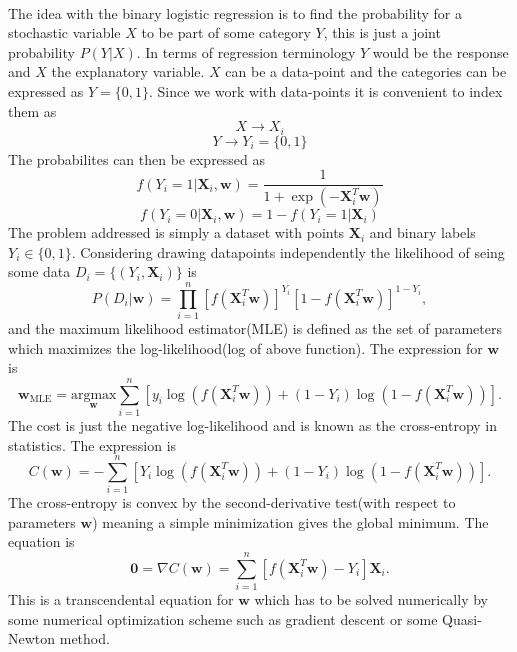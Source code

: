 \documentclass[10pt, t]{beamer}
\begin{document}
    \begin{center}
    \end{center}
    { \hspace*{\fill} \\}
    
    The idea with the binary logistic regression is to find the probability
for a stochastic variable \(X\) to be part of some category \(Y\), this
is just a joint probability \(P(Y|X)\). In terms of regression
terminology \(Y\) would be the response and \(X\) the explanatory
variable. \(X\) can be a data-point and the categories can be expressed
as \(Y=\{0,1\}\). Since we work with data-points it is convenient to
index them as \[X\rightarrow X_i\] \[Y\rightarrow Y_i=\{0,1\}\] The
probabilites can then be expressed as
\[f(Y_i=1|\boldsymbol{X}_i,\boldsymbol{w}) = \frac{1}{1 + \exp(-\boldsymbol{X}_i^T\boldsymbol{w})}\]
\[f(Y_i=0|\boldsymbol{X}_i,\boldsymbol{w}) = 1 - f(Y_i=1|\boldsymbol{X}_i)\]
The problem addressed is simply a dataset with points
\(\boldsymbol{X}_i\) and binary labels \(Y_i\in\{0,1\}\). Considering
drawing datapoints independently the likelihood of seing some data
\(D_i=\{(Y_i,\boldsymbol{X}_i)\}\) is
\[P(D_i|\boldsymbol{w}) = \prod_{i=1}^n\left[f\left(\boldsymbol{X}_i^T\boldsymbol{w}\right)\right]^{Y_i} \left[1 - f\left(\boldsymbol{X}_i^T\boldsymbol{w}\right)\right]^{1-Y_i},\]
and the maximum likelihood estimator(MLE) is defined as the set of
parameters which maximizes the log-likelihood(log of above function).
The expression for \(\boldsymbol{w}\) is
\[\boldsymbol{w}_{\text{MLE}}= \underset{\boldsymbol{w}}{\text{arg}\text{max}} \sum\limits_{i=1}^n \left[y_i\log\left(f\left(\boldsymbol{X}_i^T\boldsymbol{w}\right)\right) + (1 - Y_i)\log\left(1 - f\left(\boldsymbol{X}_i^T\boldsymbol{w}\right)\right)\right].\]
The cost is just the negative log-likelihood and is known as the
cross-entropy in statistics. The expression is
\[C(\boldsymbol{w}) = -\sum\limits_{i=1}^n \left[Y_i\log\left(f\left(\boldsymbol{X}_i^T\boldsymbol{w}\right)\right) + (1 - Y_i)\log\left(1 - f\left(\boldsymbol{X}_i^T\boldsymbol{w}\right)\right)\right].\]
The cross-entropy is convex by the second-derivative test(with respect
to parameters \(\boldsymbol{w}\)) meaning a simple minimization gives
the global minimum. The equation is
\[\boldsymbol{0} = \nabla C(\boldsymbol{w}) = \sum_{i=1}^n\left[f\left(\boldsymbol{X}_i^T\boldsymbol{w}\right) - Y_i\right]\boldsymbol{X}_i.\]
This is a transcendental equation for \(\boldsymbol{w}\) which has to be
solved numerically by some numerical optimization scheme such as
gradient descent or some Quasi-Newton method.
\end{document}
